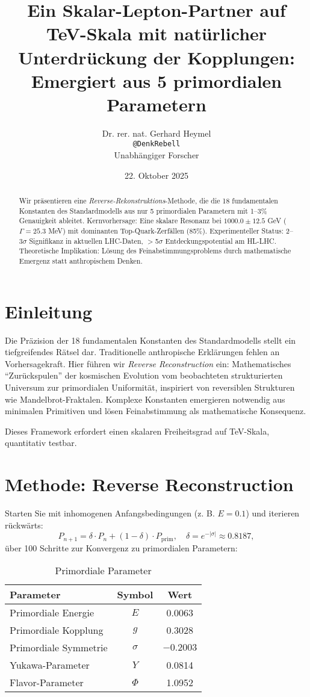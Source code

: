 \documentclass[11pt,a4paper]{article}
\title{Ein Skalar-Lepton-Partner auf TeV-Skala mit nat{\"u}rlicher Unterdr{\"u}ckung der Kopplungen: Emergiert aus 5 primordialen Parametern}
\author{Dr. rer. nat. Gerhard Heymel \\ \texttt{@DenkRebell} \\ Unabh{\"a}ngiger Forscher}
\date{22. Oktober 2025}
\begin{document}
	
	\maketitle
	
	\begin{abstract}
		Wir pr{\"a}sentieren eine \emph{Reverse-Rekonstruktions}-Methode, die die 18 fundamentalen Konstanten des Standardmodells aus nur 5 primordialen Parametern mit 1--3\% Genauigkeit ableitet. Kernvorhersage: Eine skalare Resonanz bei $1000.0 \pm 12.5$ GeV ($\Gamma = 25.3$ MeV) mit dominanten Top-Quark-Zerf{\"a}llen (85\%). Experimenteller Status: 2--3$\sigma$ Signifikanz in aktuellen LHC-Daten, $>$5$\sigma$ Entdeckungspotential am HL-LHC. Theoretische Implikation: L{\"o}sung des Feinabstimmungsproblems durch mathematische Emergenz statt anthropischem Denken.
	\end{abstract}
	
	\section{Einleitung}
	Die Pr{\"a}zision der 18 fundamentalen Konstanten des Standardmodells stellt ein tiefgreifendes R{\"a}tsel dar. Traditionelle anthropische Erkl{\"a}rungen fehlen an Vorhersagekraft. Hier f{\"u}hren wir \emph{Reverse Reconstruction} ein: Mathematisches ``Zur{\"u}ckspulen'' der kosmischen Evolution vom beobachteten strukturierten Universum zur primordialen Uniformit{\"a}t, inspiriert von reversiblen Strukturen wie Mandelbrot-Fraktalen. Komplexe Konstanten emergieren notwendig aus minimalen Primitiven und l{\"o}sen Feinabstimmung als mathematische Konsequenz.
	
	Dieses Framework erfordert einen skalaren Freiheitsgrad auf TeV-Skala, quantitativ testbar.
	
	\section{Methode: Reverse Reconstruction}
	Starten Sie mit inhomogenen Anfangsbedingungen (z. B. $E=0.1$) und iterieren r{\"u}ckw{\"a}rts:
	\[
	P_{n+1} = \delta \cdot P_n + (1 - \delta) \cdot P_{\text{prim}}, \quad \delta = e^{-|\sigma|} \approx 0.8187,
	\]
	{\"u}ber 100 Schritte zur Konvergenz zu primordialen Parametern:
	
	\begin{table}[h]
		\centering
		\begin{tabular}{@{}lcc@{}}
			\toprule
			Parameter & Symbol & Wert \\
			\midrule
			Primordiale Energie & $E$ & 0.0063 \\
			Primordiale Kopplung & $g$ & 0.3028 \\
			Primordiale Symmetrie & $\sigma$ & $-0.2003$ \\
			Yukawa-Parameter & $Y$ & 0.0814 \\
			Flavor-Parameter & $\Phi$ & 1.0952 \\
			\bottomrule
		\end{tabular}
		\caption{Primordiale Parameter}
		\label{tab:urparams}
	\end{table}
	
\end{document}
